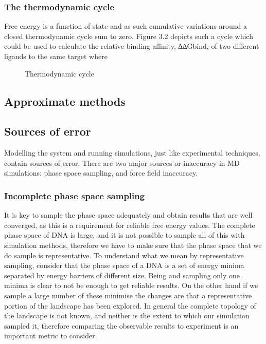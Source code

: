 \documentclass{report}
\begin{document}
\subsubsection{The thermodynamic cycle}

Free energy is a function of state and as such cumulative variations around a closed thermodynamic cycle sum to zero. Figure 3.2 depicts such a cycle which could be used to calculate the relative binding affinity, ∆∆Gbind, of two different ligands to the same target where

\begin{figure}
  \centering
  
  \caption{Thermodynamic cycle}
  \label{fig:tiescycle}
\end{figure}

\subsection{Approximate methods}

\subsection{Sources of error}

Modelling the system and running simulations, just like experimental techniques, contain sources of error. There are two major sources or inaccuracy in MD simulations: phase space sampling, and force field inaccuracy.

\subsubsection{Incomplete phase space sampling}

It is key to sample the phase space adequately and obtain results that are well converged, as this is a requirement for reliable free energy values. The complete phase space of DNA is large, and it is not possible to sample all of this with simulation methods, therefore we have to make sure that the phase space that we do sample is representative. To understand what we mean by representative sampling, consider that the phase space of a DNA is a set of energy minima separated by energy barriers of different size. Being and sampling only one minima is clear to not be enough to get reliable results. On the other hand if we sample a large number of these minimise the changes are that a representative portion of the landscape has been explored. In general the complete topology of the landscape is not known, and neither is the extent to which our simulation sampled it, therefore comparing the observable results to experiment is an important metric to consider.
\end{document}
